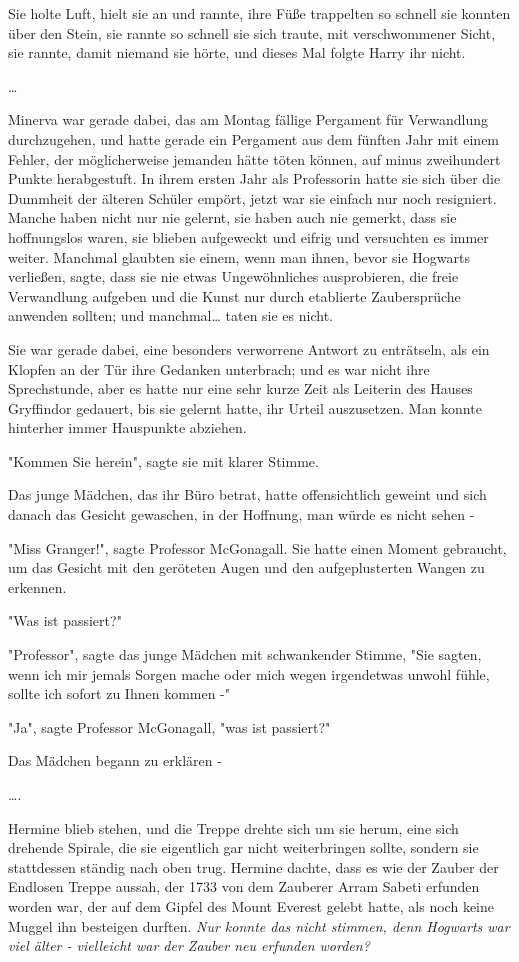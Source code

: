{Sie holte Luft, hielt sie an und rannte, ihre Füße trappelten so schnell sie konnten über den Stein, sie rannte so schnell sie sich traute, mit verschwommener Sicht, sie rannte, damit niemand sie hörte, und dieses Mal folgte Harry ihr nicht.

…

Minerva war gerade dabei, das am Montag fällige Pergament für Verwandlung durchzugehen, und hatte gerade ein Pergament aus dem fünften Jahr mit einem Fehler, der möglicherweise jemanden hätte töten können, auf minus zweihundert Punkte herabgestuft. In ihrem ersten Jahr als Professorin hatte sie sich über die Dummheit der älteren Schüler empört, jetzt war sie einfach nur noch resigniert. Manche haben nicht nur nie gelernt, sie haben auch nie gemerkt, dass sie hoffnungslos waren, sie blieben aufgeweckt und eifrig und versuchten es immer weiter. Manchmal glaubten sie einem, wenn man ihnen, bevor sie Hogwarts verließen, sagte, dass sie nie etwas Ungewöhnliches ausprobieren, die freie Verwandlung aufgeben und die Kunst nur durch etablierte Zaubersprüche anwenden sollten; und manchmal… taten sie es nicht.

Sie war gerade dabei, eine besonders verworrene Antwort zu enträtseln, als ein Klopfen an der Tür ihre Gedanken unterbrach; und es war nicht ihre Sprechstunde, aber es hatte nur eine sehr kurze Zeit als Leiterin des Hauses Gryffindor gedauert, bis sie gelernt hatte, ihr Urteil auszusetzen. Man konnte hinterher immer Hauspunkte abziehen.

"Kommen Sie herein", sagte sie mit klarer Stimme.

Das junge Mädchen, das ihr Büro betrat, hatte offensichtlich geweint und sich danach das Gesicht gewaschen, in der Hoffnung, man würde es nicht sehen -

"Miss Granger!", sagte Professor McGonagall. Sie hatte einen Moment gebraucht, um das Gesicht mit den geröteten Augen und den aufgeplusterten Wangen zu erkennen.

"Was ist passiert?"

"Professor", sagte das junge Mädchen mit schwankender Stimme, "Sie sagten, wenn ich mir jemals Sorgen mache oder mich wegen irgendetwas unwohl fühle, sollte ich sofort zu Ihnen kommen -"

"Ja", sagte Professor McGonagall, "was ist passiert?"

Das Mädchen begann zu erklären -

….

Hermine blieb stehen, und die Treppe drehte sich um sie herum, eine sich drehende Spirale, die sie eigentlich gar nicht weiterbringen sollte, sondern sie stattdessen ständig nach oben trug. Hermine dachte, dass es wie der Zauber der Endlosen Treppe aussah, der 1733 von dem Zauberer Arram Sabeti erfunden worden war, der auf dem Gipfel des Mount Everest gelebt hatte, als noch keine Muggel ihn besteigen durften. \emph{Nur konnte das nicht stimmen, denn Hogwarts war viel älter - vielleicht war der Zauber neu erfunden worden?}

}
